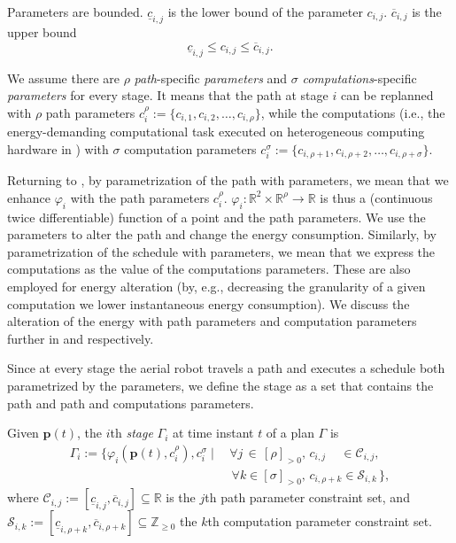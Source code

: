 Parameters are bounded. $\underline{c}_{i,j}$ is the lower bound of the parameter $c_{i,j}$. $\overline{c}_{i,j}$ is the upper bound
\begin{equation}
  \underline{c}_{i,j}\leq c_{i,j}\leq\overline{c}_{i,j}.
\end{equation}

We assume there are $\rho$ \emph{path}-specific \emph{parameters} and $\sigma$ \emph{computations}-specific \emph{parameters} for every stage. It means that the path at stage $i$ can be replanned with $\rho$ path parameters
$c_i^\rho:=\{c_{i,1},c_{i,2},\dots,c_{i,\rho}\}$,
while the computations (i.e., the energy-demanding computational task executed on heterogeneous computing hardware in ) with $\sigma$ computation parameters 
$c_i^\sigma:=\{c_{i,\rho+1},c_{i,\rho+2},\dots,c_{i,\rho+\sigma}\}$.

Returning to , by parametrization of the path with parameters, we mean that we enhance $\varphi_i$ with the path parameters $c_i^\rho$. $\varphi_i:\mathbb{R}^2\times\mathbb{R}^\rho\rightarrow\mathbb{R}$ is thus a (continuous twice differentiable) function of a point and the path parameters. We use the parameters to alter the path and change the energy consumption. Similarly, by parametrization of the schedule with parameters, we mean that we express the computations as the value of the computations parameters. These are also employed for energy alteration (by, e.g., decreasing the granularity of a given computation we lower instantaneous energy consumption). We discuss the alteration of the energy with path parameters and computation parameters further in  and  respectively.

Since at every stage the aerial robot travels a path and executes a schedule both parametrized by the parameters, we define the stage as a set that contains the path and path and computations parameters.

\begin{defn}[Stage]
  \label{def:stage}
  Given $\mathbf{p}(t)$, the $i$th \emph{stage} $\Gamma_i$ at time instant $t$ of a plan $\Gamma$ is
  \begin{equation*}\begin{split}
    \Gamma_i:=\{\varphi_i(\mathbf{p}(t),c_i^\rho),c_i^\sigma\mid
    \,&\forall j\,\in\,[\rho]_{>0},\,c_{i,j}\,\,\,\,\,\,\,\in\mathcal{C}_{i,j},\,\\
      &\,\forall k\in[\sigma]_{>0},\,c_{i,\rho+k}\in\mathcal{S}_{i,k}\,\},
  \end{split}\end{equation*}
  where $\mathcal{C}_{i,j}:=[\underline{c}_{i,j},\overline{c}_{i,j}]\subseteq\mathbb{R}$ is the $j$th path parameter constraint set, and $\mathcal{S}_{i,k}:=[\underline{c}_{i,\rho+k},\overline{c}_{i,\rho+k}]\subseteq\mathbb{Z}_{\geq 0}$ the $k$th computation parameter constraint set.
\end{defn}

